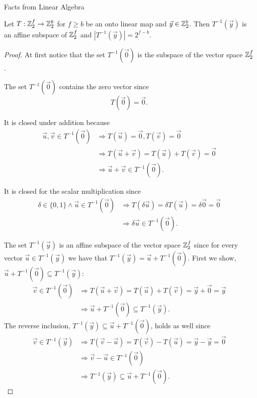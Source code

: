 \begin{chapter}{Facts from Linear Algebra}
\begin{lemma}
\label{lemma-linear-transformation-domain-distribution}
Let $T: \mathbb{Z}_{2}^{f} \rightarrow \mathbb{Z}_{2}^{b}$ for $f \geq b$ be an onto linear map and $\vec{y} \in \mathbb{Z}_{2}^{b}$. Then $T^{-1}(\vec{y})$ is an affine subspace of $\mathbb{Z}_{2}^{f}$ and $|T^{-1}(\vec{y})| = 2 ^ {f - b}$.
\end{lemma}
\begin{proof}
At first notice that the set $T^{-1}(\vec{0})$ is the subspace of the vector space $\mathbb{Z}_{2}^{f}$.

The set $T^{-1}(\vec{0})$ contains the zero vector since
\[ 
	T(\vec{0}) = \vec{0} \text{.} 
\]

It is closed under addition because
\[
\begin{split}
\vec{u}, \vec{v} \in T^{-1}(\vec{0}) 
	& \Rightarrow T(\vec{u}) = \vec{0}, T(\vec{v}) = \vec{0} \\ 
	& \Rightarrow T(\vec{u} + \vec{v}) = T(\vec{u}) + T(\vec{v}) = \vec{0} \\ 
	& \Rightarrow \vec{u} + \vec{v} \in T^{-1}(\vec{0}) \text{.}
\end{split}
\]

It is closed for the scalar multiplication since
\[
\begin{split}
\delta \in \{0, 1\} \wedge \vec{u} \in T^{-1}(\vec{0}) 
	& \Rightarrow T(\delta \vec{u}) = \delta T(\vec{u}) = \delta \vec{0} = \vec{0} \\
	& \Rightarrow \delta \vec{u} \in T^{-1}(\vec{0}) \text{.}
\end{split}
\]

The set $T^{-1}(\vec{y})$ is an affine subspace of the vector space $\mathbb{Z}_{2}^{f}$ since for every vector $\vec{u} \in T^{-1}(\vec{y})$ we have that $T^{-1}(\vec{y}) = \vec{u} + T^{-1}(\vec{0})$. First we show, $\vec{u} + T^{-1}(\vec{0}) \subseteq T^{-1}(\vec{y})$:
\[
\begin{split}
\vec{v} \in T^{-1}(\vec{0}) 
	& \Rightarrow T(\vec{u} + \vec{v}) = T(\vec{u}) + T(\vec{v}) = \vec{y} + \vec{0} = \vec{y}  \\
	& \Rightarrow \vec{u} + T^{-1}(\vec{0}) \subseteq T^{-1}(\vec{y}) \text{.}
\end{split}
\]
The reverse inclusion, $T^{-1}(\vec{y}) \subseteq \vec{u} + T^{-1}(\vec{0})$, holds as well since
\[
\begin{split}
\vec{v} \in T^{-1}(\vec{y}) 
	& \Rightarrow T(\vec{v} - \vec{u}) = T(\vec{v}) - T(\vec{u}) = \vec{y} - \vec{y} = \vec{0} \\
	& \Rightarrow \vec{v} - \vec{u} \in T^{-1}(\vec{0}) \\
	& \Rightarrow T^{-1}(\vec{y}) \subseteq \vec{u} + T^{-1}(\vec{0}) \text{.}
\end{split}
\]


\end{proof}
\end{chapter}
